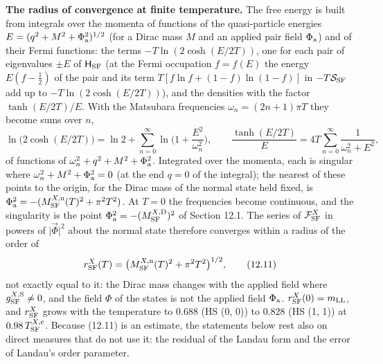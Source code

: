 \documentclass[
  10pt,
]{article}
\begin{document}
\textbf{The radius of convergence at finite temperature.} The free
energy is built from integrals over the momenta of functions of the
quasi-particle energies \(E=(q^2+M^2+\Phi_{\rm a}^2)^{1/2}\) (for a
Dirac mass \(M\) and an applied pair field \(\Phi_{\rm a}\)) and of
their Fermi functions: the terms \(-T\ln(2\cosh(E/2T))\), one for each
pair of eigenvalues \(\pm E\) of \(\mathsf H_{\rm SF}\) (at the Fermi
occupation \(f=f(E)\) the energy \(E(f-\tfrac12)\) of the pair and its
term \(T[f\ln f+(1-f)\ln(1-f)]\) in \(-T\mathcal S_{\rm SF}\) add up to
\(-T\ln(2\cosh(E/2T))\)), and the densities with the factor
\(\tanh(E/2T)/E\). With the Matsubara frequencies
\(\omega_n=(2n+1)\pi T\) they become sums over \(n\),
\[\ln\big(2\cosh(E/2T)\big)=\ln2+\sum_{n=0}^\infty\ln\Big(1+\frac{E^2}{\omega_n^2}\Big),\qquad\frac{\tanh(E/2T)}E=4T\sum_{n=0}^\infty\frac1{\omega_n^2+E^2},\]
of functions of \(\omega_n^2+q^2+M^2+\Phi_{\rm a}^2\). Integrated over
the momenta, each is singular where \(\omega_n^2+M^2+\Phi_{\rm a}^2=0\)
(at the end \(q=0\) of the integral); the nearest of these points to the
origin, for the Dirac mass of the normal state held fixed, is
\(\Phi_{\rm a}^2=-(M^{X,{\rm n}}_{\rm SF}(T)^2+\pi^2T^2)\). At \(T=0\)
the frequencies become continuous, and the singularity is the point
\(\Phi_{\rm a}^2=-(M^{X,{\rm D}}_{\rm SF})^2\) of Section 12.1. The
series of \(\mathcal F^X_{\rm SF}\) in powers of
\(\lvert\vec\Phi\rvert^2\) about the normal state therefore converges
within a radius of the order of
\[r^X_{\rm SF}(T)=\big(M^{X,{\rm n}}_{\rm SF}(T)^2+\pi^2T^2\big)^{1/2},\tag{12.11}\]
not exactly equal to it: the Dirac mass changes with the applied field
where \(g^{X,{\rm S}}_{\rm SF}\ne0\), and the field \(\Phi\) of the
states is not the applied field \(\Phi_{\rm a}\).
\(r^X_{\rm SF}(0)=m_{\rm LL}\), and \(r^X_{\rm SF}\) grows with the
temperature to \(0.688\) (HS (0, 0)) to \(0.828\) (HS (1, 1)) at
\(0.98\,T^{X,{\rm c}}_{\rm SF}\). Because (12.11) is an estimate, the
statements below rest also on direct measures that do not use it: the
residual of the Landau form and the error of Landau's order parameter.
\end{document}
